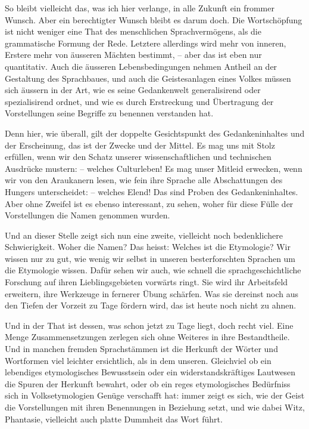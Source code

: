 So bleibt vielleicht das, was ich hier verlange, in alle Zukunft ein frommer Wunsch. Aber ein berechtigter Wunsch bleibt es darum doch. Die Wortschöpfung ist nicht weniger eine That des menschlichen Sprachvermögens, als die grammatische Formung der Rede. Letztere allerdings wird mehr von inneren, Erstere mehr von äusseren Mächten bestimmt, – aber das ist eben nur quantitativ. Auch die äusseren Lebensbedingungen nehmen Antheil an der Gestaltung des Sprachbaues, und auch die Geistesanlagen eines Volkes müssen sich äussern in der Art, wie es seine Gedankenwelt generalisirend oder spezialisirend ordnet, und wie es durch Erstreckung und Übertragung der Vorstellungen seine Begriffe zu benennen verstanden hat.

Denn hier, wie überall, gilt der doppelte Gesichtspunkt des Gedankeninhaltes und der Erscheinung, das ist der Zwecke und der Mittel. Es mag uns mit Stolz erfüllen, wenn wir den Schatz unserer wissenschaftlichen und technischen Ausdrücke mustern: – welches Culturleben! Es mag unser Mitleid erwecken, wenn wir von den Araukanern lesen, wie fein ihre Sprache alle Abschattungen des Hungers unterscheidet: – welches Elend! Das sind Proben des Gedankeninhaltes. Aber ohne Zweifel ist es ebenso interessant, zu sehen, woher für diese Fülle der Vorstellungen die Namen genommen wurden.

Und an dieser Stelle zeigt sich nun eine zweite, vielleicht noch bedenklichere Schwierigkeit. Woher die Namen? Das heisst: Welches ist \label{fp.464} die Etymologie? Wir wissen  nur zu gut, wie wenig wir selbst in unseren besterforschten Sprachen um die Etymologie wissen. Dafür sehen wir auch, wie schnell die sprachgeschichtliche Forschung auf ihren Lieblingsgebieten vorwärts ringt. Sie wird ihr Arbeitsfeld erweitern, ihre Werkzeuge in fernerer Übung schärfen. Was sie dereinst noch aus den Tiefen der Vorzeit zu Tage fördern wird, das ist heute noch nicht zu ahnen.

Und in der That ist dessen, was schon jetzt zu Tage liegt, doch recht viel. Eine Menge Zusammensetzungen zerlegen sich ohne Weiteres in ihre Bestandtheile. Und in manchen fremden Sprachstämmen ist die Herkunft der Wörter und Wortformen viel leichter ersichtlich, als in dem unseren. Gleichviel ob ein lebendiges etymologisches Bewusstsein oder ein widerstandskräftiges Lautwesen die Spuren der Herkunft bewahrt, oder ob ein reges etymologisches Bedürfniss sich in Volksetymologien Genüge verschafft hat: immer zeigt es sich, wie der Geist die Vorstellungen mit ihren Benennungen in Beziehung setzt, und wie dabei Witz, Phantasie, vielleicht auch platte Dummheit das Wort führt.

